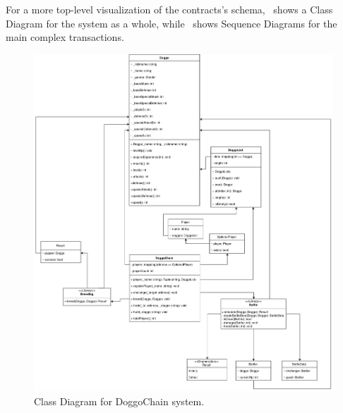 \documentclass{article}
\begin{document}
    For a more top-level visualization of the contracts's
    schema,~ shows a Class Diagram for the system as a
    whole, while~ shows Sequence
    Diagrams for the main complex transactions.

    \begin{figure}[h]
        \centering{}
        \includegraphics[width=1\textwidth]{img/DoggoChain - Class Diagram.png}
        \caption{Class Diagram for DoggoChain system.~\label{fig:class-diagram}}
    \end{figure}
\end{document}
